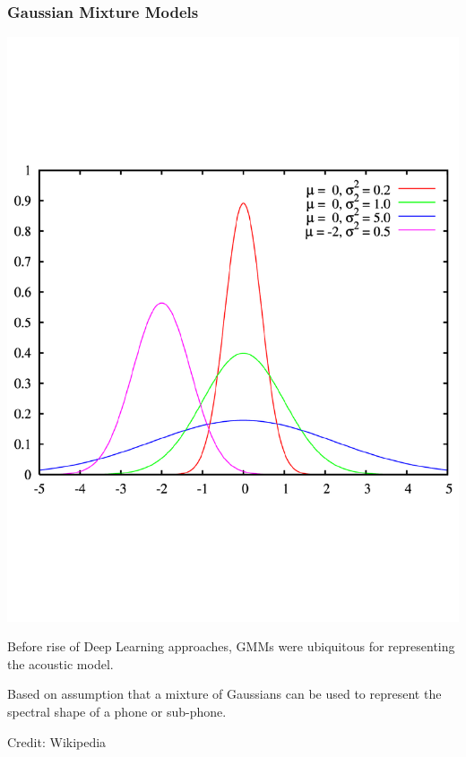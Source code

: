 \documentclass[notes]{beamer}
\begin{document}
\begin{frame}
	\frametitle{Gaussian Mixture Models}
	\begin{center}
		\includegraphics[scale=.25, clip=true, trim=0cm 5.5cm 0cm 5cm]{gmm.pdf}
	\end{center}

	\begin{center}
		Before rise of Deep Learning approaches, GMMs were ubiquitous for representing the acoustic model.
	\end{center}
	\begin{center}
		Based on assumption that a mixture of Gaussians can be used to represent the spectral shape of a phone or sub-phone.
	\end{center}	
	\begin{center}
		\tiny{Credit: Wikipedia}
	\end{center}
\end{frame}
\end{document}
